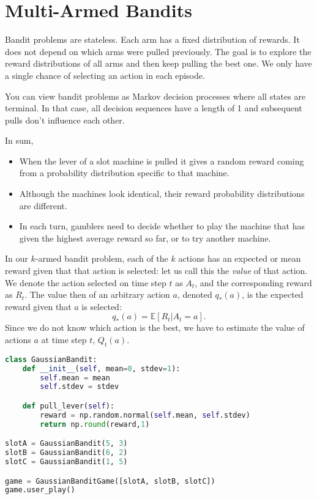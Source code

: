\section{Multi-Armed Bandits}

Bandit problems are stateless. Each arm has a fixed distribution of rewards. It does not depend on which arms were pulled previously. The goal is to explore the reward distributions of all arms and then keep pulling the best one. We only have a single chance of selecting an action in each episode. 


You can view bandit problems as Markov decision processes where all states are terminal. In that case, all decision sequences have a length of 1 and subsequent pulls don't influence each other.

In sum,
\begin{itemize}
	\item When the lever of a slot machine is pulled it gives a random reward coming from a probability distribution specific to that machine.
	\item Although the machines look identical, their reward probability distributions are different. 
	\item In each turn, gamblers need to decide whether to play the machine that has given the highest average reward so far, or to try another machine. 
\end{itemize}

In our $k$-armed bandit problem, each of the $k$ actions has an expected or mean reward given that that action is selected: let us call this the \textit{value} of that action. We denote the action selected on time step $t$ as $A_t$, and the corresponding reward as $R_t$. The value then of an arbitrary action $a$, denoted $q_*(a)$, is the expected reward given that $a$ is selected:
$$q_*(a) = \mathbb{E}[R_t|A_t=a].$$
Since we do not know which action is the best, we have to estimate the value of actions $a$ at time step $t$, $Q_t(a)$.

\begin{lstlisting}[language=Python]
class GaussianBandit:
    def __init__(self, mean=0, stdev=1):
        self.mean = mean
        self.stdev = stdev

    def pull_lever(self):
        reward = np.random.normal(self.mean, self.stdev)
        return np.round(reward,1)

slotA = GaussianBandit(5, 3)
slotB = GaussianBandit(6, 2)
slotC = GaussianBandit(1, 5)

game = GaussianBanditGame([slotA, slotB, slotC])
game.user_play()
\end{lstlisting}


